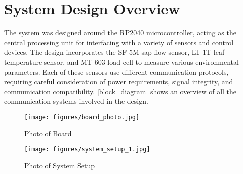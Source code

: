
\section{System Design Overview}

The system was designed around the RP2040 microcontroller, acting as the central 
processing unit for interfacing with a variety of sensors and control devices. 
The design incorporates the SF-5M sap flow sensor, LT-1T leaf temperature sensor, 
and MT-603 load cell to measure various environmental parameters. Each of these 
sensors use different communication protocols, requiring careful consideration of 
power requirements, signal integrity, and communication compatibility. \cref{block_diagram} 
shows an overview of all the communication systems involved in the design.

\begin{figure}
    \texttt{[image: figures/board\_photo.jpg]}
    \caption{Photo of Board}
    \label{board_photo}
\end{figure}

\begin{figure}
    \texttt{[image: figures/system\_setup\_1.jpg]}
    \caption{Photo of System Setup}
    \label{system_photo}
\end{figure}

